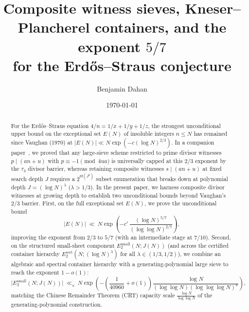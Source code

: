 \documentclass[11pt, a4paper]{article}
\theoremstyle{plain}
\theoremstyle{definition}
\begin{document}
\title{Composite witness sieves, Kneser--Plancherel containers, and the exponent $5/7$\\ for the Erd\H{o}s--Straus conjecture}
\author{Benjamin Dahan}
\date{\today}

\maketitle

\begin{abstract}
For the Erd\H{o}s--Straus equation $4/n=1/x+1/y+1/z$, the strongest unconditional upper bound on the exceptional set $E(N)$ of insoluble integers $n\le N$ has remained since Vaughan (1970) at $|E(N)|\ll N\exp(-c(\log N)^{2/3})$. In a companion paper~\cite{dahan2026a}, we proved that any large-sieve scheme restricted to prime divisor witnesses $p\mid(an+u)$ with $p\equiv-1\pmod{4ua}$ is universally capped at this $2/3$ exponent by the $\tau_3$ divisor barrier, whereas retaining composite witnesses $s\mid(an+u)$ at fixed search depth $J$ requires a $2^{\Theta(J^{4})}$ subset enumeration that breaks down at polynomial depth $J=(\log N)^{\lambda}$ ($\lambda>1/3$). In the present paper, we harness composite divisor witnesses at growing depth to establish two unconditional bounds beyond Vaughan's $2/3$ barrier. First, on the full exceptional set $E(N)$, we prove the unconditional bound
\[
|E(N)|\ \ll\ N\exp\!\left(-c'\,\frac{(\log N)^{5/7}}{(\log\log N)^{2/7}}\right),
\]
improving the exponent from $2/3$ to $5/7$ (with an intermediate stage at $7/10$). Second, on the structured small-sheet component $E_2^{\mathrm{small}}(N;J(N))$ (and across the certified container hierarchy $E_2^{\mathrm{cert}}(N;(\log N)^{\lambda})$ for all $\lambda\in(1/3,1/2)$), we combine an algebraic and spectral container hierarchy with a generating-polynomial large sieve to reach the exponent $1-o(1)$:
\[
\big|E_2^{\mathrm{small}}(N;J(N))\big|\ \ll_\kappa\ N\exp\!\left(-\left(\frac{1}{40960}+o(1)\right)\frac{\log N}{(\log\log N)(\log\log\log N)^{\kappa}}\right),
\]
matching the Chinese Remainder Theorem (CRT) capacity scale $\frac{\log N}{\log\log N}$ of the generating-polynomial construction.


\end{abstract}
\end{document}
